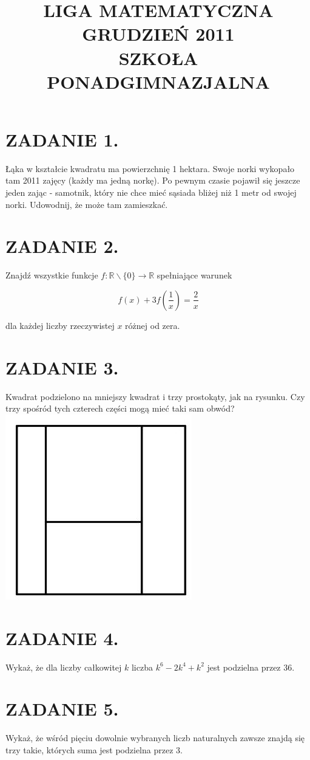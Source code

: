 \documentclass[10pt]{article}
\title{LIGA MATEMATYCZNA \\
 GRUDZIEŃ 2011 \\
 SZKOŁA PONADGIMNAZJALNA }
\author{}
\date{}
\begin{document}
\maketitle
\section*{ZADANIE 1.}
Łąka w kształcie kwadratu ma powierzchnię 1 hektara. Swoje norki wykopało tam 2011 zajęcy (każdy ma jedną norkę). Po pewnym czasie pojawił się jeszcze jeden zając - samotnik, który nie chce mieć sąsiada bliżej niż 1 metr od swojej norki. Udowodnij, że może tam zamieszkać.

\section*{ZADANIE 2.}
Znajdź wszystkie funkcje \(f: \mathbb{R} \backslash\{0\} \rightarrow \mathbb{R}\) spełniające warunek

\[
f(x)+3 f\left(\frac{1}{x}\right)=\frac{2}{x}
\]

dla każdej liczby rzeczywistej \(x\) różnej od zera.

\section*{ZADANIE 3.}
Kwadrat podzielono na mniejszy kwadrat i trzy prostokąty, jak na rysunku. Czy trzy spośród tych czterech części mogą mieć taki sam obwód?\\
\includegraphics[max width=\textwidth, center]{2024_11_21_d5e73d8f56644ddda3d4g-1}

\section*{ZADANIE 4.}
Wykaż, że dla liczby całkowitej \(k\) liczba \(k^{6}-2 k^{4}+k^{2}\) jest podzielna przez 36.

\section*{ZADANIE 5.}
Wykaż, że wśród pięciu dowolnie wybranych liczb naturalnych zawsze znajdą się trzy takie, których suma jest podzielna przez 3.
\end{document}
